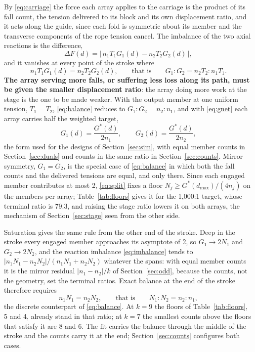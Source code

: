 \documentclass[preprint,12pt,number]{elsarticle}
\newcommand{\Gstar}{G^{*}}
\newcommand{\dmax}{d_{\max}}
\begin{document}
By \eqref{eq:carriage} the force each array applies to the carriage is the product of its fall count, the tension delivered to its block and its own displacement ratio, and it acts along the guide, since each fold is symmetric about its member and the transverse components of the rope tension cancel. The imbalance of the two axial reactions is the difference,
\begin{equation}
\Delta F(d) = \bigl|\, n_1 T_1 G_1(d) - n_2 T_2 G_2(d) \,\bigr|,
\label{eq:imbalance}
\end{equation}
and it vanishes at every point of the stroke where
\begin{equation}
n_1 T_1 G_1(d) = n_2 T_2 G_2(d), \qquad\text{that is}\qquad G_1 : G_2 = n_2 T_2 : n_1 T_1 .
\label{eq:balance}
\end{equation}
\textbf{The array serving more falls, or suffering less loss along its path, must be given the smaller displacement ratio}: the array doing more work at the stage is the one to be made weaker. With the output member at one uniform tension, $T_1 = T_2$, \eqref{eq:balance} reduces to $G_1 : G_2 = n_2 : n_1$, and with \eqref{eq:gnet} each array carries half the weighted target,
\begin{equation}
G_1(d) = \frac{\Gstar(d)}{2 n_1}, \qquad G_2(d) = \frac{\Gstar(d)}{2 n_2},
\label{eq:split}
\end{equation}
the form used for the designs of Section~\ref{sec:sim}, with equal member counts in Section~\ref{sec:duals} and counts in the same ratio in Section~\ref{sec:counts}. Mirror symmetry, $G_1 = G_2$, is the special case of \eqref{eq:balance} in which both the fall counts and the delivered tensions are equal, and only there. Since each engaged member contributes at most 2, \eqref{eq:split} fixes a floor $N_j \ge \Gstar(\dmax)/(4 n_j)$ on the members per array; Table~\ref{tab:floors} gives it for the 1,000:1 target, whose terminal ratio is 79.3, and raising the stage ratio lowers it on both arrays, the mechanism of Section~\ref{sec:stage} seen from the other side.

Saturation gives the same rule from the other end of the stroke. Deep in the stroke every engaged member approaches its asymptote of 2, so $G_1 \to 2N_1$ and $G_2 \to 2N_2$, and the reaction imbalance \eqref{eq:imbalance} tends to $|n_1 N_1 - n_2 N_2| / (n_1 N_1 + n_2 N_2)$ whatever the spans: with equal member counts it is the mirror residual $|n_1 - n_2|/k$ of Section~\ref{sec:odd}, because the counts, not the geometry, set the terminal ratios. Exact balance at the end of the stroke therefore requires
\begin{equation}
n_1 N_1 = n_2 N_2, \qquad\text{that is}\qquad N_1 : N_2 = n_2 : n_1,
\label{eq:counts}
\end{equation}
the discrete counterpart of \eqref{eq:balance}. At $k=9$ the floors of Table~\ref{tab:floors}, 5 and 4, already stand in that ratio; at $k=7$ the smallest counts above the floors that satisfy it are 8 and 6. The fit carries the balance through the middle of the stroke and the counts carry it at the end; Section~\ref{sec:counts} configures both cases.
\end{document}
